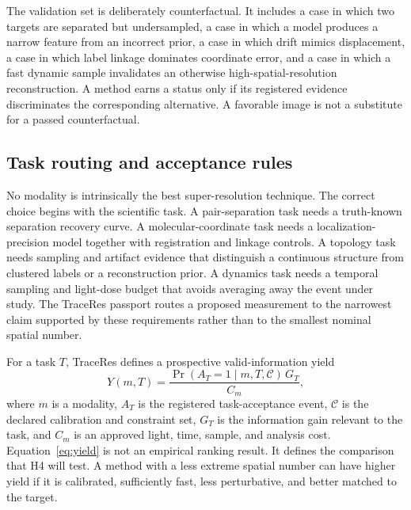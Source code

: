 \documentclass[conference]{IEEEtran}
\begin{document}
The validation set is deliberately counterfactual. It includes a case in which two targets are separated but undersampled, a case in which a model produces a narrow feature from an incorrect prior, a case in which drift mimics displacement, a case in which label linkage dominates coordinate error, and a case in which a fast dynamic sample invalidates an otherwise high-spatial-resolution reconstruction. A method earns a status only if its registered evidence discriminates the corresponding alternative. A favorable image is not a substitute for a passed counterfactual.

\subsection{Task routing and acceptance rules}

No modality is intrinsically the best super-resolution technique. The correct choice begins with the scientific task. A pair-separation task needs a truth-known separation recovery curve. A molecular-coordinate task needs a localization-precision model together with registration and linkage controls. A topology task needs sampling and artifact evidence that distinguish a continuous structure from clustered labels or a reconstruction prior. A dynamics task needs a temporal sampling and light-dose budget that avoids averaging away the event under study. The TraceRes passport routes a proposed measurement to the narrowest claim supported by these requirements rather than to the smallest nominal spatial number.

For a task \(T\), TraceRes defines a prospective valid-information yield
\begin{equation}
 Y(m,T)=\frac{\Pr\!\left(A_T=1\mid m,T,\mathcal{C}\right)\,G_T}{C_m},
\label{eq:yield}
\end{equation}
where \(m\) is a modality, \(A_T\) is the registered task-acceptance event, \(\mathcal{C}\) is the declared calibration and constraint set, \(G_T\) is the information gain relevant to the task, and \(C_m\) is an approved light, time, sample, and analysis cost. Equation~\eqref{eq:yield} is not an empirical ranking result. It defines the comparison that H4 will test. A method with a less extreme spatial number can have higher yield if it is calibrated, sufficiently fast, less perturbative, and better matched to the target.
\end{document}
